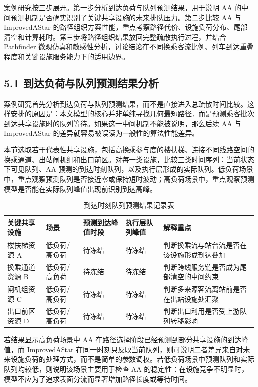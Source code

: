 \documentclass[UTF8,a4paper,12pt]{ctexart}
\begin{document}
案例研究按三步展开。第一步分析到达负荷与队列预测结果，用于说明 AA 的中间预测机制是否确实识别了关键共享设施的未来排队压力。第二步比较 AA 与 ImprovedAStar 的路径组织方案性能，重点考察路径代价、设施负荷分布、尾部清空和计算耗时。第三步将路径组织结果放回完整疏散执行过程，并结合 Pathfinder 微观仿真和敏感性分析，讨论结论在不同换乘客流比例、列车到达重叠程度和关键设施服务能力下的适用边界。

\subsection{5.1 到达负荷与队列预测结果分析}

案例研究首先分析到达负荷与队列预测结果，而不是直接进入总疏散时间比较。这样安排的原因是：本文模型的核心并非单纯寻找几何最短路径，而是预测乘客批次到达共享设施时的队列等待。如果这一中间机制不能被说明，那么后续 AA 与 ImprovedAStar 的差异就容易被误读为一般性的算法性能差异。

本节选取若干代表性共享设施，包括高换乘参与度的楼扶梯、连接不同线路空间的换乘通道、出站闸机组和出口前区。对每一类设施，比较三类时间序列：当前状态下可见队列、AA 预测的到达时刻队列，以及执行层形成的实际队列。低负荷场景中，重点观察预测队列是否接近零或保持短时波动；高负荷场景中，重点观察预测模型是否能在实际队列峰值出现前识别到达高峰。

\begin{table}[htbp]
\centering
\caption{到达时刻队列预测结果记录表}
\small
\begin{tabular}{p{}p{}p{}p{}p{}}
\toprule
关键共享设施 & 场景 & 预测到达峰值时段 & 执行层队列峰值 & 解释重点 \\
\midrule
楼扶梯资源 A & 低负荷/高负荷 & 待冻结 & 待冻结 & 判断换乘流与站台流是否在该设施形成到达叠加 \\
换乘通道资源 B & 低负荷/高负荷 & 待冻结 & 待冻结 & 判断跨线服务链是否成为尾部清空的中间约束 \\
闸机组资源 C & 低负荷/高负荷 & 待冻结 & 待冻结 & 判断多来源客流离站前是否在出站设施处汇聚 \\
出口前区资源 D & 低负荷/高负荷 & 待冻结 & 待冻结 & 判断出口利用是否受上游队列转移影响 \\
\bottomrule
\end{tabular}
\end{table}

若结果显示高负荷场景中 AA 在路径选择阶段已经预测到部分共享设施的到达峰值，而 ImprovedAStar 在同一时刻只反映当前队列，则可说明二者差异来自对未来设施负荷的处理方式，而不是简单的参数调权。若低负荷场景中预测队列和实际队列均较低，则说明该场景主要用于检查 AA 的稳定性：在设施竞争不明显时，模型不应为了追求表面分流而显著增加路径长度或等待时间。
\end{document}
